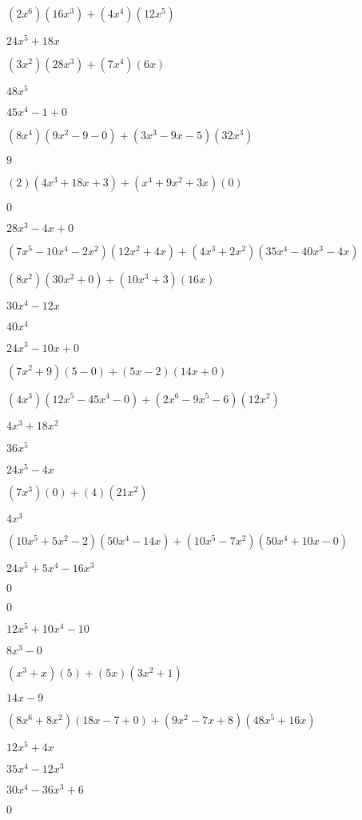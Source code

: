 \documentclass{article}
\begin{document}
\begin{multicols}{2}
$(2x^{6})(16x^{3})+(4x^{4})(12x^{5})$\item $24x^{5}+18x$\item $(3x^2)(28x^{3})+(7x^{4})(6x)$\item $48x^{5}$\item $45x^{4}-1+0$\item $(8x^{4})(9x^{2}-9-0)+(3x^{3}-9x-5)(32x^{3})$\item $9$\item $(2)(4x^{3}+18x+3)+(x^{4}+9x^2+3x)(0)$\item $0$\item $28x^{3}-4x+0$\item $(7x^{5}-10x^{4}-2x^2)(12x^{2}+4x)+(4x^{3}+2x^2)(35x^{4}-40x^{3}-4x)$\item $(8x^2)(30x^{2}+0)+(10x^{3}+3)(16x)$\item $30x^{4}-12x$\item $40x^{4}$\item $24x^{3}-10x+0$\item $(7x^2+9)(5-0)+(5x-2)(14x+0)$\item $(4x^{3})(12x^{5}-45x^{4}-0)+(2x^{6}-9x^{5}-6)(12x^{2})$\item $4x^{3}+18x^{2}$\item $36x^{5}$\item $24x^{5}-4x$\item $(7x^{3})(0)+(4)(21x^{2})$\item $4x^{3}$\item $(10x^{5}+5x^2-2)(50x^{4}-14x)+(10x^{5}-7x^2)(50x^{4}+10x-0)$\item $24x^{5}+5x^{4}-16x^{3}$\item $0$\item $0$\item $12x^{5}+10x^{4}-10$\item $8x^{3}-0$\item $(x^{3}+x)(5)+(5x)(3x^{2}+1)$\item $14x-9$\item $(8x^{6}+8x^2)(18x-7+0)+(9x^2-7x+8)(48x^{5}+16x)$\item $12x^{5}+4x$\item $35x^{4}-12x^{3}$\item $30x^{4}-36x^{3}+6$\item $0$\item 
\end{multicols}
\end{document}
